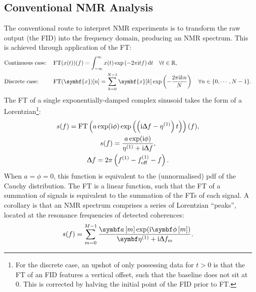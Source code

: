 \subsection{Conventional NMR Analysis}
The conventional route to interpret \ac{NMR} experiments is to
transform the raw output (the \ac{FID}) into the frequency domain, producing an
\ac{NMR} spectrum. This is achieved through application of the \acf{FT}:
\begin{subequations}
    \begin{flalign}
        &\text{Continuous case:} &&\FT( x(t) )(f) =  \int_{-\infty}^{\infty} x(t) \exp \left(
            -2 \pi \iu t f \right) \mathrm{d} t
            \quad \forall t \in \mathbb{R},\\
        &\text{Discrete case:} &&\FT( \symbf{x} )[n] =  \sum_{k=0}^{N-1} \symbf{x}[k] \exp \left(
            -\frac{2 \pi \iu k n}{N} \right)
            \quad \forall n \in \lbrace 0, \cdots, N-1 \rbrace.
    \end{flalign}
\end{subequations}
The \ac{FT} of a single exponentially-damped complex sinusoid takes the form of
a Lorentzian\footnote{
    For the discrete case, an upshot of only possessing data for $t > 0$ is
    that the \ac{FT} of an \ac{FID} features a vertical offset,
    such that the baseline does not sit at 0\cite{Tang1994}. This is corrected
    by halving the initial point of the \ac{FID} prior to \ac{FT}.
}:
\begin{subequations}
    \begin{gather}
        s(f) = \operatorname{FT}\left(
            a \exp(\mathrm{i} \phi) \exp\left(\left(\mathrm{i} \Updelta f - \eta^{(1)}\right) t\right) \right) (f),\\
        s(f) = \frac{a \exp(\mathrm{i} \phi) }
            {\eta^{(1)} + \mathrm{i} \Updelta f},\\
        \Updelta f = 2 \pi \left(f^{(1)} - f_{\mathrm{off}}^{(1)} - f \right).
    \end{gather}
\end{subequations}
When $a = \phi = 0$, this function is equivalent to the (unnormalised) \ac{pdf}
of the Cauchy distribution. The \ac{FT} is a linear function, such that the
\ac{FT} of a summation of signals is equivalent to the summation of the
\acp{FT} of each signal. A corollary is that an \ac{NMR} spectrum comprises a
series of Lorentzian ``peaks'', located at the resonance frequencies of
detected
coherences:
\begin{equation}
    s(f) = \sum_{m=0}^{M-1}
    \frac{\bdam \exp(\iu \bdphim)}
    {\bdetaone + \iu \Updelta f_m}.
    \label{eq:ft-summation}
\end{equation}

